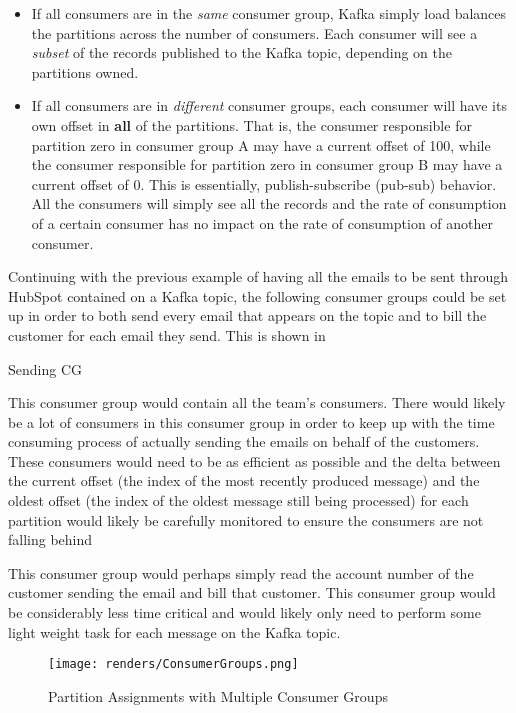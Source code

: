 \begin{itemize}
\item{If all consumers are in the \textit{same} consumer group, Kafka simply load balances the partitions across the number of consumers}. Each consumer will see a \textit{subset} of the records published to the Kafka topic, depending on the partitions owned.
\item{If all consumers are in \textit{different} consumer groups, each consumer will have its own offset in \textbf{all} of the partitions. That is, the consumer responsible for partition zero in consumer group A may have a current offset of 100, while the consumer responsible for partition zero in consumer group B may have a current offset of 0. This is essentially, publish-subscribe (pub-sub) behavior. All the consumers will simply see all the records and the rate of consumption of a certain consumer has no impact on the rate of consumption of another consumer.}
\end{itemize}

Continuing with the previous example of having all the emails to be sent through HubSpot contained on a Kafka topic, the following consumer groups could be set up in order to both send every email that appears on the topic and to bill the customer for each email they send. This is shown in 
\begin{labeling}{Sending CG}
\item[Sending CG]{This consumer group would contain all the \team{} team's consumers. There would likely be a lot of consumers in this consumer group in order to keep up with the time consuming process of actually sending the emails on behalf of the customers. These consumers would need to be as efficient as possible and the delta between the current offset (the index of the most recently produced message) and the oldest offset (the index of the oldest message still being processed) for each partition would likely be carefully monitored to ensure the consumers are not falling behind}
\item[Billing CG]{This consumer group would perhaps simply read the account number of the customer sending the email and bill that customer. This consumer group would be considerably less time critical and would likely only need to perform some light weight task for each message on the Kafka topic.}
\end{labeling}


\begin{figure}[H]
      \centering
      \texttt{[image: renders/ConsumerGroups.png]}
      \caption{Partition Assignments with Multiple Consumer Groups}
      \label{fig:consumerGroups}
\end{figure}  

